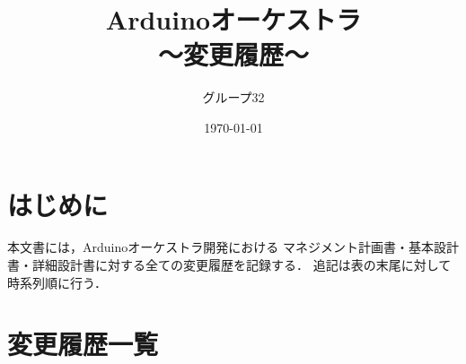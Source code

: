 \documentclass[lualatex,a4paper,jafontsize=11pt,jafontscale=1.05]{jlreq}
\title{Arduinoオーケストラ \\ 〜変更履歴〜}
\author{グループ32}
\date{\today}
\begin{document}
\maketitle

\section*{はじめに}
本文書には，Arduinoオーケストラ開発における
マネジメント計画書・基本設計書・詳細設計書に対する全ての変更履歴を記録する．
追記は表の末尾に対して時系列順に行う．

\section*{変更履歴一覧}

\end{document}

